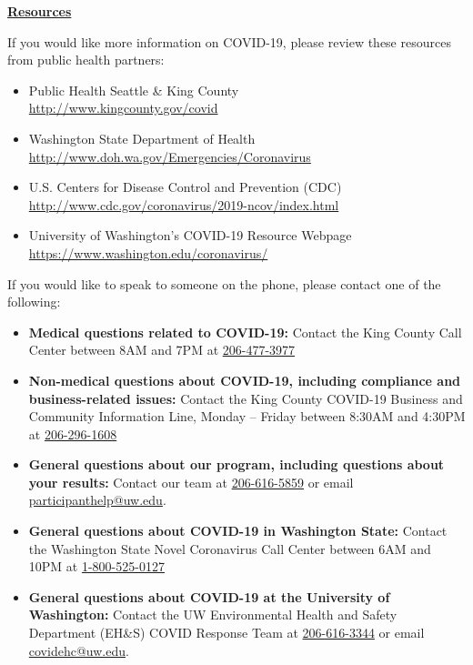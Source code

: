 \documentclass[10pt]{article}
\begin{document}
\bigskip

\large \underline{\textbf{Resources}}

If you would like more information on COVID-19, please review these resources
from public health partners:

\begin{itemize}
\item
  Public Health \textemdash Seattle \& King County\\
  \url{http://www.kingcounty.gov/covid}

\item

  Washington State Department of Health\\
  \url{http://www.doh.wa.gov/Emergencies/Coronavirus}

\item
  U.S. Centers for Disease Control and Prevention (CDC)\\
  \url{http://www.cdc.gov/coronavirus/2019-ncov/index.html}

\item
  University of Washington’s COVID-19 Resource Webpage\\
  \url{https://www.washington.edu/coronavirus/}

\end{itemize}

If you would like to speak to someone on the phone, please contact one of the
following:

\begin{itemize}

\item

  \textbf{Medical questions related to COVID-19:} Contact the King County Call
  Center between 8AM and 7PM at \href{tel:+1-206-477-3977}{206-477-3977}

\item

  \textbf{Non-medical questions about COVID-19, including compliance and
  business-related issues:} Contact the King County COVID-19 Business and
  Community Information Line, Monday – Friday between 8:30AM and 4:30PM at
  \href{tel:+1-206-296-1608}{206-296-1608}

\item
  \textbf{General questions about our program, including questions about your
  results:} Contact our team at \href{tel:+1-206-616-5859}{206-616-5859} or email
  \href{mailto:participanthelp@uw.edu}{participanthelp@uw.edu}.

\item

  \textbf{General questions about COVID-19 in Washington State:} Contact the
  Washington State Novel Coronavirus Call Center between 6AM and 10PM at
  \href{tel:+1-800-525-0127}{1-800-525-0127}

\item
  \textbf{General questions about COVID-19 at the University of Washington:}
  Contact the UW Environmental Health and Safety Department (EH\&S) COVID
  Response Team at \href{tel:+1-206-616-3344}{206-616-3344} or email \href{mailto:covidehc@uw.edu}{covidehc@uw.edu}.

\end{itemize}
\end{document}
